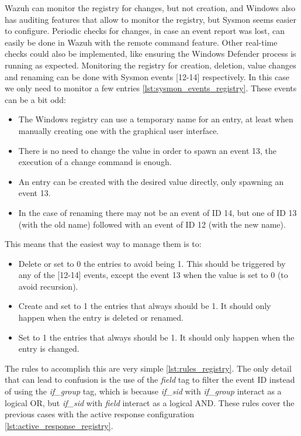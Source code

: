 \linej
Wazuh can monitor the registry for changes, but not creation, and Windows also has auditing features that allow to monitor the registry, but Sysmon seems easier to configure.
Periodic checks for changes, in case an event report was lost, can easily be done in Wazuh with the remote command feature.
Other real-time checks could also be implemented, like ensuring the Windows Defender process is running as expected.
\linej
Monitoring the registry for creation, deletion, value changes and renaming can be done with Sysmon events [12-14] respectively.
In this case we only need to monitor a few entries \ref{lst:sysmon_events_registry}.
These events can be a bit odd:
\begin{itemize}
	\item The Windows registry can use a temporary name for an entry, at least when manually creating one with the graphical user interface.
	\item There is no need to change the value in order to spawn an event 13, the execution of a change command is enough.
	\item An entry can be created with the desired value directly, only spawning an event 13.
	\item In the case of renaming there may not be an event of ID 14, but one of ID 13 (with the old name) followed with an event of ID 12 (with the new name).
\end{itemize}
\linej
This means that the easiest way to manage them is to:
\begin{itemize}
	\item Delete or set to 0 the entries to avoid being 1. This should be triggered by any of the [12-14] events, except the event 13 when the value is set to 0 (to avoid recursion).
	\item Create and set to 1 the entries that always should be 1. It should only happen when the entry is deleted or renamed.
	\item Set to 1 the entries that always should be 1. It should only happen when the entry is changed.
\end{itemize}
\linej
The rules to accomplish this are very simple \ref{lst:rules_registry}.
The only detail that can lead to confusion is the use of the \textit{field} tag to filter the event ID instead of using the \textit{if\_group} tag, which is because \textit{if\_sid} with \textit{if\_group} interact as a logical OR, but \textit{if\_sid} with \textit{field} interact as a logical AND.
\linej
These rules cover the previous cases with the active response configuration \ref{lst:active_response_registry}.
